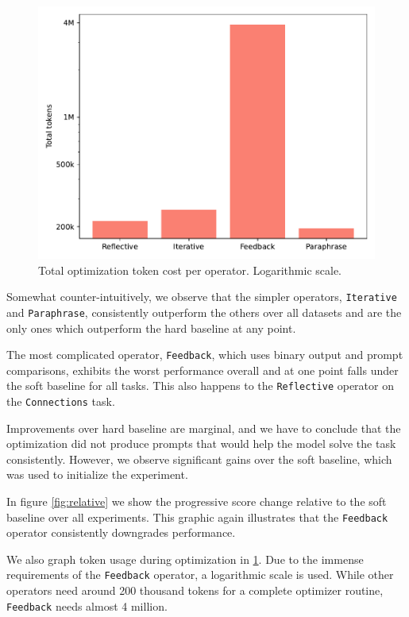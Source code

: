 \begin{figure}
    \includegraphics[width=\linewidth]{usage.pdf}
    \caption{Total optimization token cost per operator. Logarithmic scale.}
    \label{fig:usage}
\end{figure}

Somewhat counter-intuitively, we observe that the simpler operators, \texttt{Iterative} and \texttt{Paraphrase},
consistently outperform the others over all datasets and are the only ones which outperform the hard baseline at any point.

The most complicated operator, \texttt{Feedback}, which uses binary output and prompt comparisons, exhibits the
worst performance overall and at one point falls under the soft baseline for all tasks. This also happens to the
\texttt{Reflective} operator on the \texttt{Connections} task.

Improvements over hard baseline are marginal, and we have to conclude that the optimization did not produce 
prompts that would help the model solve the task consistently. However, we observe significant gains 
over the soft baseline, which was used to initialize the experiment.

In figure \ref{fig:relative} we show the progressive score change relative to the soft baseline
over all experiments. This graphic again illustrates that the \texttt{Feedback} operator consistently downgrades performance.

We also graph token usage during optimization in \ref{fig:usage}. Due to the immense requirements of
the \texttt{Feedback} operator, a logarithmic scale is used. While other operators need around 200 thousand tokens for a complete optimizer routine,
\texttt{Feedback} needs almost 4 million.


